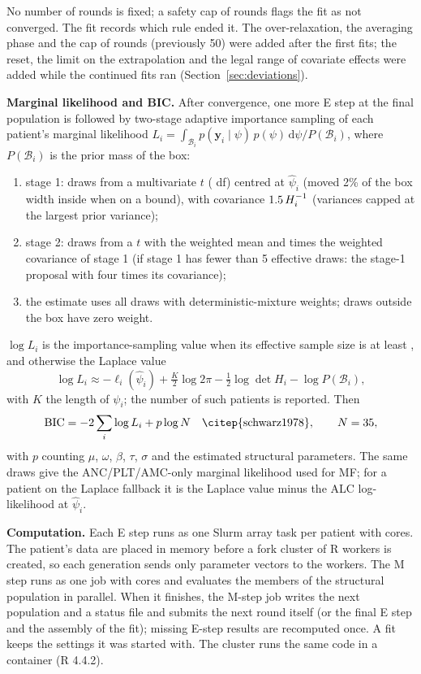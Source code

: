 \documentclass[11pt]{article}
\newcommand{\dd}{\mathrm{d}}
\begin{document}
No number of rounds is fixed; a safety cap of \valOutMax{} rounds flags the fit as not converged. The fit records which rule ended it. The over-relaxation, the averaging phase and the cap of \valOutMax{} rounds (previously 50) were added after the first fits; the reset, the limit on the extrapolation and the legal range of covariate effects were added while the continued fits ran (Section~\ref{sec:deviations}).

\textbf{Marginal likelihood and BIC.} After convergence, one more E step at the final population is followed by two-stage adaptive importance sampling of each patient's marginal likelihood $L_i=\int_{\mathcal B_i}p(\mathbf y_i\mid\psi)\,p(\psi)\,\dd\psi/P(\mathcal B_i)$, where $P(\mathcal B_i)$ is the prior mass of the box:
\begin{enumerate}
\item stage 1: \valIsN{} draws from a multivariate $t$ (\valIsDf{} df) centred at $\hat\psi_i$ (moved 2\% of the box width inside when on a bound), with covariance $1.5\,H_i^{-1}$ (variances capped at the largest prior variance);
\item stage 2: \valIsNtwo{} draws from a $t$ with the weighted mean and \valIsScale{} times the weighted covariance of stage 1 (if stage 1 has fewer than 5 effective draws: the stage-1 proposal with four times its covariance);
\item the estimate uses all draws with deterministic-mixture weights; draws outside the box have zero weight.
\end{enumerate}
$\log L_i$ is the importance-sampling value when its effective sample size is at least \valIsEss, and otherwise the Laplace value
\begin{equation}
\log L_i \approx -\ell_i(\hat\psi_i) + \tfrac{K}{2}\log 2\pi - \tfrac12\log\det H_i - \log P(\mathcal B_i),
\end{equation}
with $K$ the length of $\psi_i$; the number of such patients is reported. Then
\[
\mathrm{BIC}=-2\sum_i\log L_i+p\log N \quad\text{\citep{schwarz1978}},\qquad N=35,
\]
with $p$ counting $\mu$, $\omega$, $\beta$, $\tau$, $\sigma$ and the estimated structural parameters. The same draws give the ANC/PLT/AMC-only marginal likelihood used for MF; for a patient on the Laplace fallback it is the Laplace value minus the ALC log-likelihood at $\hat\psi_i$.

\textbf{Computation.} Each E step runs as one Slurm array task per patient with \valEcores{} cores. The patient's data are placed in memory before a fork cluster of R workers is created, so each generation sends only parameter vectors to the workers. The M step runs as one job with \valMcores{} cores and evaluates the members of the structural population in parallel. When it finishes, the M-step job writes the next population and a status file and submits the next round itself (or the final E step and the assembly of the fit); missing E-step results are recomputed once. A fit keeps the settings it was started with. The cluster runs the same code in a container (R 4.4.2).
\end{document}
